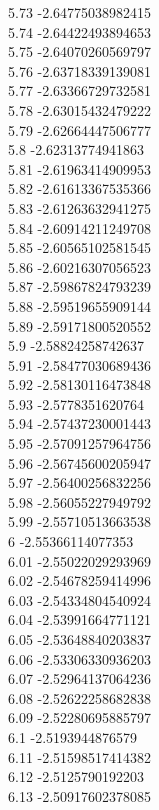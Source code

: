 {5.73	-2.64775038982415\\
5.74	-2.64422493894653\\
5.75	-2.64070260569797\\
5.76	-2.63718339139081\\
5.77	-2.63366729732581\\
5.78	-2.63015432479222\\
5.79	-2.62664447506777\\
5.8	-2.62313774941863\\
5.81	-2.61963414909953\\
5.82	-2.61613367535366\\
5.83	-2.61263632941275\\
5.84	-2.60914211249708\\
5.85	-2.60565102581545\\
5.86	-2.60216307056523\\
5.87	-2.59867824793239\\
5.88	-2.59519655909144\\
5.89	-2.59171800520552\\
5.9	-2.58824258742637\\
5.91	-2.58477030689436\\
5.92	-2.58130116473848\\
5.93	-2.5778351620764\\
5.94	-2.57437230001443\\
5.95	-2.57091257964756\\
5.96	-2.56745600205947\\
5.97	-2.56400256832256\\
5.98	-2.56055227949792\\
5.99	-2.55710513663538\\
6	-2.55366114077353\\
6.01	-2.55022029293969\\
6.02	-2.54678259414996\\
6.03	-2.54334804540924\\
6.04	-2.53991664771121\\
6.05	-2.53648840203837\\
6.06	-2.53306330936203\\
6.07	-2.52964137064236\\
6.08	-2.52622258682838\\
6.09	-2.52280695885797\\
6.1	-2.5193944876579\\
6.11	-2.51598517414382\\
6.12	-2.5125790192203\\
6.13	-2.50917602378085\\
}
